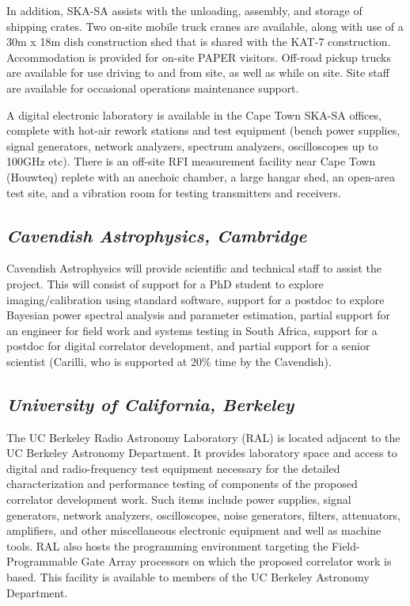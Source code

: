 \documentclass[11pt]{article}
\begin{document}
In addition, SKA-SA assists with the unloading, assembly, and storage of
shipping crates. Two on-site mobile truck cranes are available, along with use
of a 30m x 18m dish construction shed that is shared with the KAT-7 construction.
Accommodation is provided for on-site PAPER visitors. Off-road pickup trucks
are available for use driving to and from site, as well as while on site.  Site staff are available for
occasional operations maintenance support.

A digital electronic laboratory is available in the Cape Town SKA-SA offices,
complete with hot-air rework stations and test equipment (bench
power supplies, signal generators, network analyzers, spectrum analyzers,
oscilloscopes up to 100GHz etc). There is an off-site RFI measurement facility
near Cape Town (Houwteq) replete with 
an anechoic
chamber, a large hangar shed, an open-area test site, and a vibration room for testing
transmitters and receivers.

\subsection*{\it Cavendish Astrophysics, Cambridge}

Cavendish Astrophysics will provide scientific and technical staff to assist the project.  This will consist of
support for a PhD student to explore imaging/calibration using standard software,
support for a postdoc to explore Bayesian power spectral analysis and parameter estimation,
partial support for an engineer for field work and systems testing in South Africa, support for a postdoc for
digital correlator development, and partial support for a senior scientist (Carilli, who is supported 
at 20\% time by the Cavendish).

\subsection*{\it University of California, Berkeley}

The UC Berkeley Radio Astronomy Laboratory (RAL) is located adjacent to the UC
Berkeley Astronomy Department. It provides laboratory space and access to
digital and radio-frequency test equipment necessary for the detailed
characterization and performance testing of components of the proposed correlator
development work. Such items include power supplies, signal generators, network
analyzers, oscilloscopes, noise generators, filters, attenuators, amplifiers,
and other miscellaneous electronic equipment and well as machine tools. RAL also hosts the programming
environment targeting the Field-Programmable Gate Array processors on which the
proposed correlator work is based. This facility is available to members of the
UC Berkeley Astronomy Department.
\end{document}
